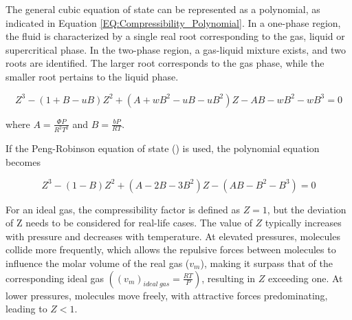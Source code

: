 \documentclass[../Article_Model_Parameters.tex]{subfiles}
\begin{document}
	\begin{table}[h!]
		\centering
		\caption{Parameters for Popular Cubic EoS.}
		\label{tab:Popular_Cubic_EoS_alpha}
	\end{table}
	
	The general cubic equation of state can be represented as a polynomial, as indicated in Equation \ref{EQ:Compressibility_Polynomial}. In a one-phase region, the fluid is characterized by a single real root corresponding to the gas, liquid or supercritical phase. In the two-phase region, a gas-liquid mixture exists, and two roots are identified. The larger root corresponds to the gas phase, while the smaller root pertains to the liquid phase.
	
	{\footnotesize
		\begin{equation}
			\label{EQ:Compressibility_Polynomial}
			Z^3 - (1+B-uB)Z^2+(A+wB^2-uB-uB^2)Z - AB - wB^2 - wB^3 = 0
	\end{equation} }

	where $A=\frac{\Phi P}{R^2T^2}$ and $B=\frac{bP}{RT}$.
	
	If the Peng-Robinson equation of state (\citet{Peng1976}) is used, the polynomial equation becomes
	
	{\footnotesize
	\begin{equation}
		\label{EQ:Peng_Robinson_Polynomial}
		Z^3 - (1-B)Z^2+(A-2B-3B^2)Z -(AB-B^2-B^3) = 0
	\end{equation} }
	
	For an ideal gas, the compressibility factor is defined as $Z = 1$, but the deviation of Z needs to be considered for real-life cases. The value of $Z$ typically increases with pressure and decreases with temperature. At elevated pressures, molecules collide more frequently, which allows the repulsive forces between molecules to influence the molar volume of the real gas ($v_m$), making it surpass that of the corresponding ideal gas $\left( \left(v_m\right)_{ideal~gas} = \frac{RT}{P} \right)$, resulting in $Z$ exceeding one. At lower pressures, molecules move freely, with attractive forces predominating, leading to $Z < 1$.
	
\end{document}
